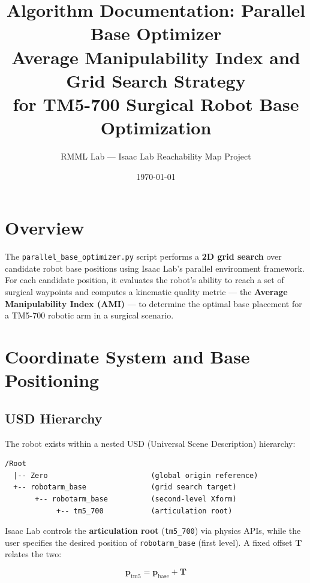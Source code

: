 \documentclass[a4paper,11pt]{article}
\title{%
    \textbf{Algorithm Documentation: Parallel Base Optimizer} \\[6pt]
    \large Average Manipulability Index and Grid Search Strategy \\
    for TM5-700 Surgical Robot Base Optimization
}
\author{RMML Lab — Isaac Lab Reachability Map Project}
\date{\today}
\begin{document}
\maketitle

\section{Overview}

The \texttt{parallel\_base\_optimizer.py} script performs a \textbf{2D grid search} over candidate robot base positions using Isaac Lab's parallel environment framework. For each candidate position, it evaluates the robot's ability to reach a set of surgical waypoints and computes a kinematic quality metric — the \textbf{Average Manipulability Index (AMI)} — to determine the optimal base placement for a TM5-700 robotic arm in a surgical scenario.

\section{Coordinate System and Base Positioning}

\subsection{USD Hierarchy}

The robot exists within a nested USD (Universal Scene Description) hierarchy:

\begin{verbatim}
/Root
  |-- Zero                        (global origin reference)
  +-- robotarm_base               (grid search target)
       +-- robotarm_base          (second-level Xform)
            +-- tm5_700           (articulation root)
\end{verbatim}

Isaac Lab controls the \textbf{articulation root} (\texttt{tm5\_700}) via physics APIs, while the user specifies the desired position of \texttt{robotarm\_base} (first level). A fixed offset $\mathbf{T}$ relates the two:

\begin{equation}
    \mathbf{p}_{\text{tm5}} = \mathbf{p}_{\text{base}} + \mathbf{T}
    \label{eq:offset}
\end{equation}
\end{document}
